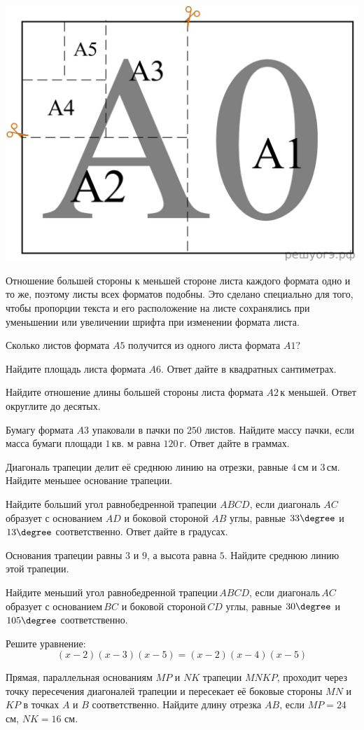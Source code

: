 \begin{homework}[number=2]
\begin{listofex}
		\begin{center}
			\includegraphics[align=t, width=0.4\linewidth]{../pics/G91M6L1}
		\end{center}
		Отношение большей стороны к меньшей стороне листа каждого формата одно и то же, поэтому листы всех форматов подобны. Это сделано специально для того, чтобы пропорции текста и его расположение на листе сохранялись при уменьшении или увеличении шрифта при изменении формата листа.
		\item Сколько листов формата \( A5 \) получится из одного листа формата \( A1 \)?
		\item Найдите площадь листа формата \( A6 \). Ответ дайте в квадратных сантиметрах.
		\item Найдите отношение длины большей стороны листа формата \( A2 \) к меньшей. Ответ округлите до десятых.
		\item Бумагу формата \( A3 \) упаковали в пачки по \( 250 \) листов. Найдите массу пачки, если масса бумаги площади \( 1 \) кв. м равна \( 120 \) г. Ответ дайте в граммах.
		\item Диагональ трапеции делит её среднюю линию на отрезки, равные \( 4 \) см и \( 3 \) см. Найдите меньшее основание трапеции.
		\item Найдите больший угол равнобедренной трапеции \( ABCD \), если диагональ \( AC \) образует с основанием \( AD \) и боковой стороной \( AB \) углы, равные \( 33\degree \) и \( 13\degree  \) соответственно. Ответ дайте в градусах.
		\item Основания трапеции равны \( 3 \) и \( 9 \), а высота равна \( 5 \). Найдите среднюю линию этой трапеции.
		\item Найдите меньший угол равнобедренной трапеции \( ABCD \), если диагональ \( AC \) образует с основанием \( BC \) и боковой стороной \( CD \) углы, равные \( 30\degree \) и \( 105\degree \) соответственно.
		\item Решите уравнение:
		\[(x-2)(x-3)(x-5)=(x-2)(x-4)(x-5)\]
		\item Прямая, параллельная основаниям \( MP \) и \( NK \) трапеции \( MNKP \), проходит через точку пересечения диагоналей трапеции и пересекает её боковые стороны \( MN \) и \( KP \) в точках \( A \) и \( B \) соответственно. Найдите длину отрезка \( AB \), если \( MP=24 \) см, \( NK=16 \) см.
	\end{listofex}
\end{homework}

